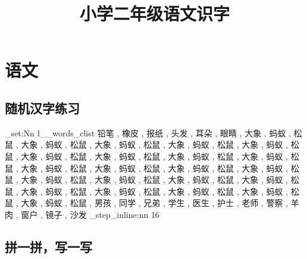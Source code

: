 \documentclass[scheme=chinese]{ctexart}
\title{小学二年级语文识字}
\begin{document}
\maketitle
\section{语文}
\subsection{随机汉字练习}
\setlength{\parindent}{0pt}

\ExplSyntaxOn
\clist_set:Nn \l__words_clist
{
{铅笔} , {橡皮} , {报纸} ,
{头发} , {耳朵} , {眼睛} ,
{大象} , {蚂蚁} , {松鼠} ,
{大象} , {蚂蚁} , {松鼠} ,
{大象} , {蚂蚁} , {松鼠} ,
{大象} , {蚂蚁} , {松鼠} ,
{大象} , {蚂蚁} , {松鼠} ,
{大象} , {蚂蚁} , {松鼠} ,
{大象} , {蚂蚁} , {松鼠} ,
{大象} , {蚂蚁} , {松鼠} ,
{大象} , {蚂蚁} , {松鼠} ,
{大象} , {蚂蚁} , {松鼠} ,
{大象} , {蚂蚁} , {松鼠} ,
{大象} , {蚂蚁} , {松鼠} ,
{大象} , {蚂蚁} , {松鼠} ,
{大象} , {蚂蚁} , {松鼠} ,
{大象} , {蚂蚁} , {松鼠} ,
{大象} , {蚂蚁} , {松鼠} ,
{大象} , {蚂蚁} , {松鼠} ,
{大象} , {蚂蚁} , {松鼠} ,
{大象} , {蚂蚁} , {松鼠} ,
{大象} , {蚂蚁} , {松鼠} ,
{大象} , {蚂蚁} , {松鼠} ,
{大象} , {蚂蚁} , {松鼠} ,
{男孩} , {同学} , {兄弟} ,
{学生} , {医生} , {护士} ,
{老师} , {警察} , {羊肉} ,
{窗户} , {镜子} , {沙发}
}
\int_step_inline:nn {16}
{
\hspace{1cm}
}
\ExplSyntaxOff

\subsection{拼一拼，写一写}
\end{document}
